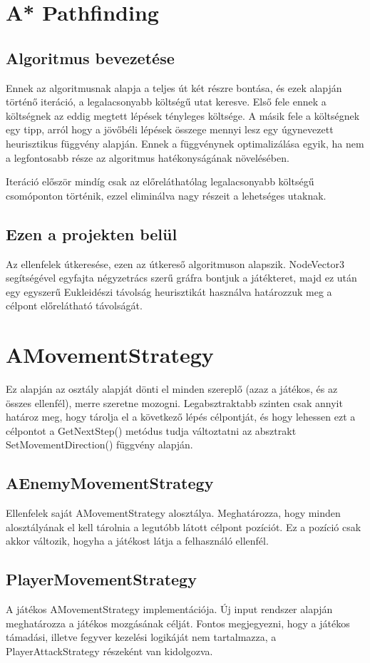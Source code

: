 \documentclass[
]{thesis-ekf}
\theoremstyle{definition}
\theoremstyle{remark}
\begin{document}
	\section{A* Pathfinding}
	\subsection{Algoritmus bevezetése}
	Ennek az algoritmusnak alapja a teljes út két részre bontása, és ezek alapján történő iteráció, a legalacsonyabb költségű utat keresve. Első fele ennek a költségnek az eddig megtett lépések tényleges költsége. A másik fele a költségnek egy tipp, arról hogy a jövőbéli lépések összege mennyi lesz egy úgynevezett heurisztikus függvény alapján. Ennek a függvénynek optimalizálása egyik, ha nem a legfontosabb része az algoritmus hatékonyságának növelésében.
	
	Iteráció először mindíg csak az előreláthatólag legalacsonyabb költségű csomóponton történik, ezzel eliminálva nagy részeit a lehetséges utaknak.
	\subsection{Ezen a projekten belül}
	Az ellenfelek útkeresése, ezen az útkereső algoritmuson alapszik. NodeVector3 segítségével egyfajta négyzetrács szerű gráfra bontjuk a játékteret, majd ez után egy egyszerű Eukleidészi távolság heurisztikát használva határozzuk meg a célpont előrelátható távolságát.
	\section{AMovementStrategy}
	Ez alapján az osztály alapját dönti el minden szereplő (azaz a játékos, és az összes ellenfél), merre szeretne mozogni. Legabsztraktabb szinten csak annyit határoz meg, hogy tárolja el a következő lépés célpontját, és hogy lehessen ezt a célpontot a GetNextStep() metódus tudja változtatni az absztrakt SetMovementDirection() függvény alapján.
	\subsection{AEnemyMovementStrategy}
	Ellenfelek saját AMovementStrategy alosztálya. Meghatározza, hogy minden alosztályának el kell tárolnia a legutóbb látott célpont pozíciót. Ez a pozíció csak akkor változik, hogyha a játékost látja a felhasználó ellenfél.
	\subsection{PlayerMovementStrategy}
	A játékos AMovementStrategy implementációja. Új input rendszer alapján meghatározza a játékos mozgásának célját. Fontos megjegyezni, hogy a játékos támadási, illetve fegyver kezelési logikáját nem tartalmazza, a PlayerAttackStrategy részeként van kidolgozva.
\end{document}
